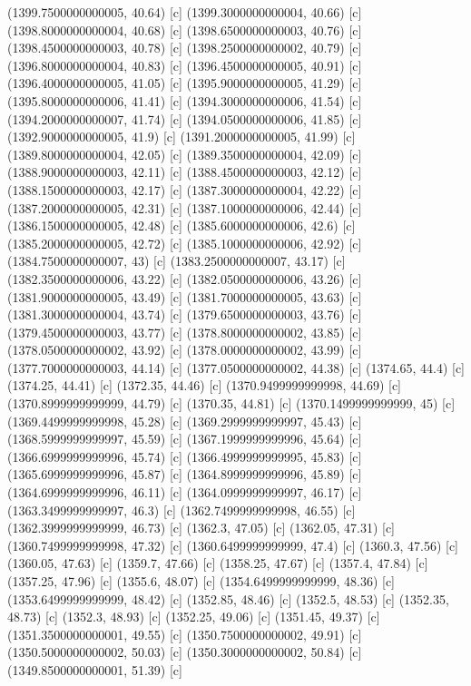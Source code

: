 {{{(1399.7500000000005, 40.64) [c] 
(1399.3000000000004, 40.66) [c] 
(1398.8000000000004, 40.68) [c] 
(1398.6500000000003, 40.76) [c] 
(1398.4500000000003, 40.78) [c] 
(1398.2500000000002, 40.79) [c] 
(1396.8000000000004, 40.83) [c] 
(1396.4500000000005, 40.91) [c] 
(1396.4000000000005, 41.05) [c] 
(1395.9000000000005, 41.29) [c] 
(1395.8000000000006, 41.41) [c] 
(1394.3000000000006, 41.54) [c] 
(1394.2000000000007, 41.74) [c] 
(1394.0500000000006, 41.85) [c] 
(1392.9000000000005, 41.9) [c] 
(1391.2000000000005, 41.99) [c] 
(1389.8000000000004, 42.05) [c] 
(1389.3500000000004, 42.09) [c] 
(1388.9000000000003, 42.11) [c] 
(1388.4500000000003, 42.12) [c] 
(1388.1500000000003, 42.17) [c] 
(1387.3000000000004, 42.22) [c] 
(1387.2000000000005, 42.31) [c] 
(1387.1000000000006, 42.44) [c] 
(1386.1500000000005, 42.48) [c] 
(1385.6000000000006, 42.6) [c] 
(1385.2000000000005, 42.72) [c] 
(1385.1000000000006, 42.92) [c] 
(1384.7500000000007, 43) [c] 
(1383.2500000000007, 43.17) [c] 
(1382.3500000000006, 43.22) [c] 
(1382.0500000000006, 43.26) [c] 
(1381.9000000000005, 43.49) [c] 
(1381.7000000000005, 43.63) [c] 
(1381.3000000000004, 43.74) [c] 
(1379.6500000000003, 43.76) [c] 
(1379.4500000000003, 43.77) [c] 
(1378.8000000000002, 43.85) [c] 
(1378.0500000000002, 43.92) [c] 
(1378.0000000000002, 43.99) [c] 
(1377.7000000000003, 44.14) [c] 
(1377.0500000000002, 44.38) [c] 
(1374.65, 44.4) [c] 
(1374.25, 44.41) [c] 
(1372.35, 44.46) [c] 
(1370.9499999999998, 44.69) [c] 
(1370.8999999999999, 44.79) [c] 
(1370.35, 44.81) [c] 
(1370.1499999999999, 45) [c] 
(1369.4499999999998, 45.28) [c] 
(1369.2999999999997, 45.43) [c] 
(1368.5999999999997, 45.59) [c] 
(1367.1999999999996, 45.64) [c] 
(1366.6999999999996, 45.74) [c] 
(1366.4999999999995, 45.83) [c] 
(1365.6999999999996, 45.87) [c] 
(1364.8999999999996, 45.89) [c] 
(1364.6999999999996, 46.11) [c] 
(1364.0999999999997, 46.17) [c] 
(1363.3499999999997, 46.3) [c] 
(1362.7499999999998, 46.55) [c] 
(1362.3999999999999, 46.73) [c] 
(1362.3, 47.05) [c] 
(1362.05, 47.31) [c] 
(1360.7499999999998, 47.32) [c] 
(1360.6499999999999, 47.4) [c] 
(1360.3, 47.56) [c] 
(1360.05, 47.63) [c] 
(1359.7, 47.66) [c] 
(1358.25, 47.67) [c] 
(1357.4, 47.84) [c] 
(1357.25, 47.96) [c] 
(1355.6, 48.07) [c] 
(1354.6499999999999, 48.36) [c] 
(1353.6499999999999, 48.42) [c] 
(1352.85, 48.46) [c] 
(1352.5, 48.53) [c] 
(1352.35, 48.73) [c] 
(1352.3, 48.93) [c] 
(1352.25, 49.06) [c] 
(1351.45, 49.37) [c] 
(1351.3500000000001, 49.55) [c] 
(1350.7500000000002, 49.91) [c] 
(1350.5000000000002, 50.03) [c] 
(1350.3000000000002, 50.84) [c] 
(1349.8500000000001, 51.39) [c] 
}}}
